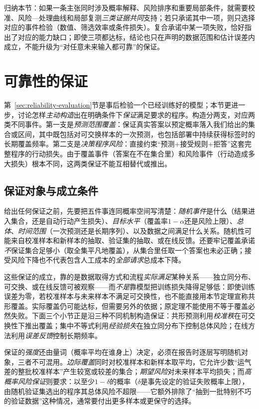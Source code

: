 归纳本节：如果一条主张同时涉及概率解释、风险排序和重要局部条件，就需要校准、风险—处理曲线和局部复测\emph{三类证据共同}支持；若只承诺其中一项，则只选择对应的事件检验（数值、筛选效率或条件损失）。复合承诺中某一项失败，恰好指出了对应的能力缺口；即使三项都达标，结论也只在声明的数据范围和估计误差内成立，不能升级为“对任意未来输入都可靠”的保证。

\section{可靠性的保证}
\label{sec:reliability-guarantee}

第~\ref{sec:reliability-evaluation}节是事后检验一个已经训练好的模型；本节更进一步，讨论怎样\emph{主动构造}出在明确条件下\emph{保证}满足要求的程序。构造分两支，对应两类不同事件。第一支是\emph{预测范围覆盖}：保证真实答案以预定概率落入我们给出的集合或区间，其中既包括对可交换样本的一次预测，也包括部署中持续获得标签时的长期覆盖频率。第二支是\emph{决策程序风险}：直接约束“预测+接受规则+拒答”这套完整程序的行动损失。由于覆盖事件（答案在不在集合里）和风险事件（行动造成多大损失）根本不同，这两类保证不能互相替代或推出。

\subsection{保证对象与成立条件}

给出任何保证之前，先要把五件事连同概率空间写清楚：\emph{随机事件}是什么（结果进入集合，还是自动行动产生损失）、\emph{目标水平}（覆盖率$1-\alpha$还是风险上限）、\emph{总体}、\emph{时间范围}（一次预测还是长期序列）、以及数据之间满足什么关系。随机性可能来自校准样本和新样本的抽取、验证集的抽取、或在线反馈。还要牢记覆盖承诺\emph{不}保证集合足够小（取全集平凡地覆盖），从集合里任取一个答案也未必正确；接受风险下降也不代表包含人工成本的\emph{全部请求}总成本下降。

这些保证的成立，靠的是数据取得方式和流程\emph{实际满足}某种关系——独立同分布、可交换、或在线反馈可被观察——而\emph{不是}靠模型把训练损失降得足够低：即使训练误差为零，若校准样本与未来样本不满足可交换性，也不能直接用本节定理宣称共形覆盖。实际覆盖仍可能达标，但需要另外的依据；原定理不能使用不等于覆盖必然失败。下面三个小节正是沿三种不同机制构造保证：共形预测利用\emph{校准秩}在可交换性下推出覆盖；集中不等式利用\emph{经验损失}在独立同分布下控制总体风险；在线方法利用\emph{误差反馈}控制长期频率。

保证的\emph{强度}还由量词（概率平均在谁身上）决定，必须在报告时逐层写明随机对象，三者不可混用。\emph{边际覆盖}同时对校准样本和新样本取平均，它允许少数“运气差的整批校准样本”产生较宽或较差的集合；\emph{期望风险}对未来样本平均损失；而\emph{高概率风险保证}则要求：以至少$1-\delta$的概率（$\delta$是事先设定的验证失败概率上限），由随机验证集选出的程序其总体风险不超限——它额外排除了“抽到一批特别不巧的验证数据”这种情况，通常要付出更多样本或更保守的选择。

